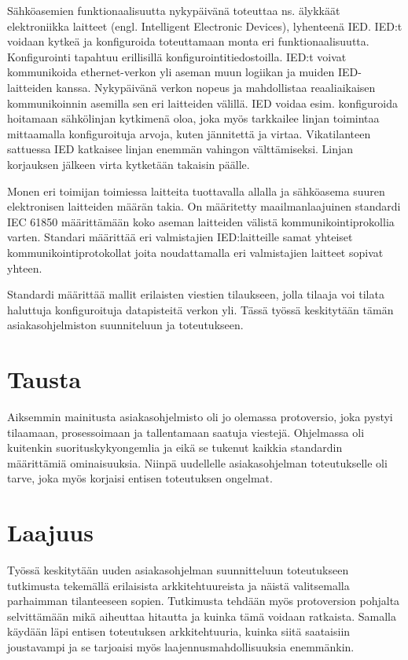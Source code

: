 Sähköasemien funktionaalisuutta nykypäivänä toteuttaa ns. älykkäät elektroniikka laitteet (engl. Intelligent Electronic Devices), lyhenteenä IED. IED:t voidaan kytkeä ja konfiguroida toteuttamaan monta eri funktionaalisuutta. Konfigurointi tapahtuu erillisillä konfigurointitiedostoilla. IED:t voivat kommunikoida ethernet-verkon yli aseman muun logiikan ja muiden IED-laitteiden kanssa. Nykypäivänä verkon nopeus ja mahdollistaa reaaliaikaisen kommunikoinnin asemilla sen eri laitteiden välillä. IED voidaa esim. konfiguroida hoitamaan sähkölinjan kytkimenä oloa, joka myös tarkkailee linjan toimintaa mittaamalla konfiguroituja arvoja, kuten jännitettä ja virtaa. Vikatilanteen sattuessa IED katkaisee linjan enemmän vahingon välttämiseksi. Linjan korjauksen jälkeen virta kytketään takaisin päälle.

Monen eri toimijan toimiessa laitteita tuottavalla allalla ja sähköasema suuren elektronisen laitteiden määrän takia. On määritetty maailmanlaajuinen standardi IEC 61850 määrittämään koko aseman laitteiden välistä kommunikointiprokollia varten. Standari määrittää eri valmistajien IED:laitteille samat yhteiset kommunikointiprotokollat joita noudattamalla eri valmistajien laitteet sopivat yhteen.

Standardi määrittää mallit erilaisten viestien tilaukseen, jolla tilaaja voi tilata haluttuja konfiguroituja datapisteitä verkon yli. Tässä työssä keskitytään tämän asiakasohjelmiston suunniteluun ja toteutukseen.

\section{Tausta}

Aiksemmin mainitusta asiakasohjelmisto oli jo olemassa protoversio, joka pystyi tilaamaan, prosessoimaan ja tallentamaan saatuja viestejä. Ohjelmassa oli kuitenkin suorituskykyongemlia ja eikä se tukenut kaikkia standardin määrittämiä ominaisuuksia. Niinpä uudellelle asiakasohjelman toteutukselle oli tarve, joka myös korjaisi entisen toteutuksen ongelmat.

\section{Laajuus}

Työssä keskitytään uuden asiakasohjelman suunnitteluun toteutukseen tutkimusta tekemällä erilaisista arkkitehtuureista ja näistä valitsemalla parhaimman tilanteeseen sopien. Tutkimusta tehdään myös protoversion pohjalta selvittämään mikä aiheuttaa hitautta ja kuinka tämä voidaan ratkaista. Samalla käydään läpi entisen toteutuksen arkkitehtuuria, kuinka siitä saataisiin joustavampi ja se tarjoaisi myös laajennusmahdollisuuksia enemmänkin.

